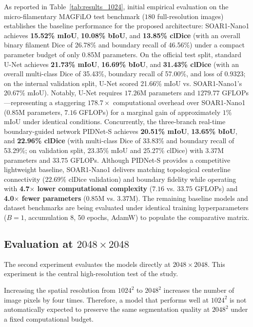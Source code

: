 \documentclass[11pt,a4paper]{article}
\begin{document}
As reported in Table~\ref{tab:results_1024}, initial empirical evaluation on the 
micro-filamentary MAGFiLO test benchmark ($180$ full-resolution images) establishes 
the baseline performance for the proposed architecture: SOAR1-Nano1 achieves \textbf{15.52\% mIoU}, 
\textbf{10.08\% bIoU}, and \textbf{13.85\% clDice} (with an overall binary filament Dice of 
26.78\% and boundary recall of 46.56\%) under a compact parameter budget of only 0.85M parameters. 
On the official test split, standard U-Net achieves \textbf{21.73\% mIoU}, 
\textbf{16.69\% bIoU}, and \textbf{31.43\% clDice} (with an overall multi-class Dice of 
35.43\%, boundary recall of 57.00\%, and loss of $0.9323$; on the internal validation split, U-Net scored 21.66\% mIoU vs. SOAR1-Nano1's 20.67\% mIoU). Notably, 
U-Net requires $17.26$M parameters and $1279.77$ GFLOPs---representing a staggering 
$178.7\times$ computational overhead over SOAR1-Nano1 ($0.85$M parameters, $7.16$ GFLOPs) 
for a marginal gain of approximately $1\%$ mIoU under identical conditions. Concurrently, the three-branch real-time boundary-guided network PIDNet-S achieves \textbf{20.51\% mIoU}, \textbf{13.65\% bIoU}, and \textbf{22.96\% clDice} (with multi-class Dice of 33.83\% and boundary recall of 53.29\%; on validation split, 23.35\% mIoU and 25.27\% clDice) with $3.37$M parameters and $33.75$ GFLOPs. Although PIDNet-S provides a competitive lightweight baseline, SOAR1-Nano1 delivers matching topological centerline connectivity ($22.69\%$ clDice validation) and boundary fidelity while operating with \textbf{4.7$\times$ lower computational complexity} ($7.16$ vs. $33.75$ GFLOPs) and \textbf{4.0$\times$ fewer parameters} ($0.85$M vs. $3.37$M). The remaining baseline models and dataset 
benchmarks are being evaluated under identical training hyperparameters ($B=1$, accumulation 8, 50 epochs, AdamW) to populate the comparative matrix.


\subsection{Evaluation at $2048\times2048$}

The second experiment evaluates the models directly at 
$2048\times2048$. This experiment is the central high-resolution test of the 
study.

Increasing the spatial resolution from $1024^2$ to $2048^2$ increases the 
number of image pixels by four times. Therefore, a model that performs well 
at $1024^2$ is not automatically expected to preserve the same segmentation 
quality at $2048^2$ under a fixed computational budget.
\end{document}
